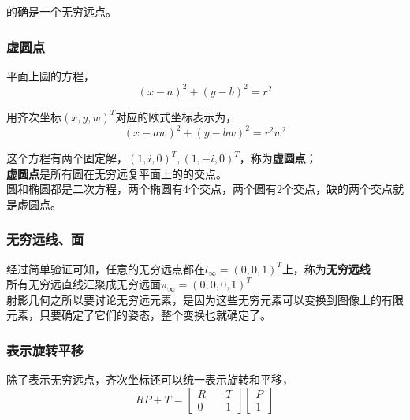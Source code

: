 		的确是一个无穷远点。

	\subsubsection*{虚圆点}		

		平面上圆的方程，
		$$
			(x - a)^2 + (y - b)^2 = r^2
		$$

		用齐次坐标$(x,y,w)^T$对应的欧式坐标表示为，
		$$
			(x - aw)^2 + (y - bw)^2 = r^2w^2
		$$

		这个方程有两个固定解，$(1,i,0)^T, (1,-i,0)^T$，称为\textbf{虚圆点}；\\

		\textbf{虚圆点}是所有圆在无穷远复平面上的的交点。\\

		圆和椭圆都是二次方程，两个椭圆有4个交点，两个圆有2个交点，缺的两个交点就是虚圆点。

	\subsubsection*{无穷远线、面}
		经过简单验证可知，任意的无穷远点都在$l_{\infty} = (0,0,1)^T$上，称为\textbf{无穷远线}\\

		所有无穷远直线汇聚成无穷远面$\pi_{\infty} = (0,0,0,1)^T$\\

		射影几何之所以要讨论无穷远元素，是因为这些无穷元素可以变换到图像上的有限元素，只要确定了它们的姿态，整个变换也就确定了。

	\subsubsection*{表示旋转平移}
	 除了表示无穷远点，齐次坐标还可以统一表示旋转和平移，
	 $$
	 	RP +T = \begin{bmatrix}
	 		R \quad& T\\
	 		0 \quad& 1
	 	\end{bmatrix}
	 	\begin{bmatrix}
	 		P\\
	 		1
	 	\end{bmatrix}
	 $$